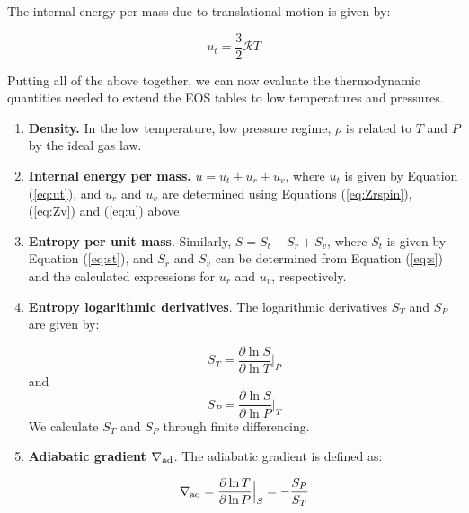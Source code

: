 The internal energy per mass due to translational motion is given by:

\begin{equation}
\label{eq:ut}
u_t=\frac{3}{2} \mathcal{R} T
\end{equation}

Putting all of the above together, we can now evaluate the thermodynamic quantities needed to extend the \cite{saumon95} EOS tables to low temperatures and pressures.

\begin{enumerate}

\item{\textbf{Density.}} In the low temperature, low pressure regime, $\rho$ is related to $T$ and $P$ by the ideal gas law. %
\item{\textbf{Internal energy per mass.}} $u=u_t+u_r+u_v$, where $u_t$ is given by Equation (\ref{eq:ut}), and $u_r$ and $u_v$ are determined using Equations (\ref{eq:Zrspin}), (\ref{eq:Zv}) and (\ref{eq:u}) above.
\item{\textbf{Entropy per unit mass}}. Similarly, $S=S_t+S_r+S_v$, where $S_t$ is given by Equation (\ref{eq:st}), and $S_r$ and $S_v$ can be determined from Equation (\ref{eq:s}) and the calculated expressions for $u_r$ and $u_v$, respectively.
\item{\textbf{Entropy logarithmic derivatives}}. The logarithmic derivatives $S_T$ and $S_P$ are given by:

\begin{equation}
\label{eq:sT}
S_T=\frac{\partial \ln{S}}{\partial \ln{T}} \Big |_P
\end{equation}
and
\begin{equation}
\label{eq:sP}
S_P=\frac{\partial \ln{S}}{\partial \ln{P}} \Big |_T
\end{equation}
We calculate $S_T$ and $S_P$ through finite differencing. 

\item{\textbf{Adiabatic gradient $\nabla_{\rm ad}$}}. The adiabatic gradient is defined as:

\begin{equation}
\label{eq:deladSP}
\nabla_{\rm ad}=\frac{\partial \ln{T}}{\partial \ln{P}} \Big |_S = -\frac{S_P}{S_T}
\end{equation}


\end{enumerate}

